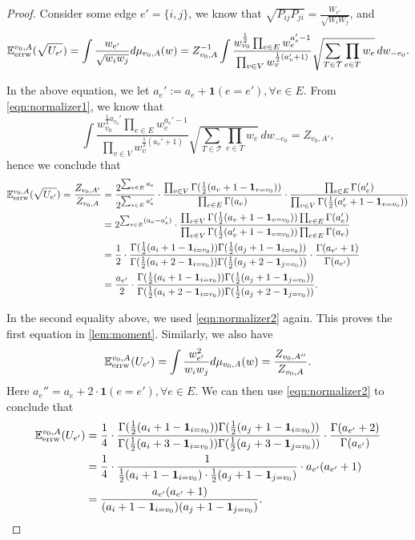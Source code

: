 \documentclass[a4paper, 11pt]{article}
\newcommand{\E}{\mathbb{E}}
\newcommand{\Eerrw}{\E_{\textnormal{errw}}}
\newcommand{\ind}{\mathbf{1}}
\begin{document}
\begin{proof}
Consider some edge $e'=\{i,j\}$, we know that $\sqrt{P_{ij}P_{ji}}=\frac{W_{e'}}{\sqrt{W_iW_j}}$, and
\begin{equation}
\label{eqn:moment1}
\Eerrw^{v_0,A} (\sqrt{U_{e'}}) = \int \frac{w_{e'}}{\sqrt{w_iw_j}} d\mu_{v_0,A}(w) = Z_{v_0, A}^{-1}\int \frac{w_{v_0}^{\frac{1}{2}}\prod_{e\in E}w_e^{a_e'-1}} {\prod_{v\in V}w_v^{\frac{1}{2}(a_v'+1)}}
\sqrt{\sum_{T\in\mathcal{T}}\prod_{e\in T}w_e}\,dw_{-e_0}.
\end{equation}

In the above equation, we let $a_e':=a_e+\ind(e=e'), \forall e\in E$. From \cref{eqn:normalizer1}, we know that
\[\int \frac{w_{v_0}^{\frac{1}{2}a_{v_0}'}\prod_{e\in E}w_e^{a_e'-1}} {\prod_{v\in V}w_v^{\frac{1}{2}(a_v'+1)}}
\sqrt{\sum_{T\in\mathcal{T}}\prod_{e\in T}w_e}\,dw_{-e_0}=Z_{v_0,A'},\]hence we conclude that
\begin{align}
\label{eqn:moment2}
\Eerrw^{v_0,A}(\sqrt{U_{e'}})
= \frac{Z_{v_0, A'}}{Z_{v_0, A}}
&= \frac{2^{\sum_{e\in E}a_e}}{2^{\sum_{e\in E}a_e'}}\cdot \frac{\prod_{v\in V}\Gamma(\frac{1}{2}(a_v+1-\ind_{v=v_0}))}{\prod_{e\in E}\Gamma(a_e)}\cdot \frac{\prod_{e\in E}\Gamma(a_e')}{\prod_{v\in V}\Gamma(\frac{1}{2}(a_v'+1-\ind_{v=v_0}))}\nonumber \\
&= 2^{\sum_{e\in E}(a_e-a_e')}\cdot \frac{\prod_{v\in V}\Gamma(\frac{1}{2}(a_v+1-\ind_{v=v_0}))\prod_{e\in E}\Gamma(a_e')}{\prod_{v\in V}\Gamma(\frac{1}{2}(a_v'+1-\ind_{v=v_0})) \prod_{e\in E}\Gamma(a_e)}\nonumber \\
&= \frac{1}{2}\cdot \frac{\Gamma(\frac{1}{2}(a_i+1-\ind_{i=v_0}))\Gamma(\frac{1}{2}(a_j+1-\ind_{i=v_0}))}{\Gamma(\frac{1}{2}(a_i+2-\ind_{i=v_0}))\Gamma(\frac{1}{2}(a_j+2-\ind_{j=v_0}))}\cdot \frac{\Gamma(a_{e'}+1)}{\Gamma(a_{e'})}\nonumber \\
&= \frac{a_{e'}}{2}\cdot \frac{\Gamma(\frac{1}{2}(a_i+1-\ind_{i=v_0}))\Gamma(\frac{1}{2}(a_j+1-\ind_{j=v_0}))}{\Gamma(\frac{1}{2}(a_i+2-\ind_{i=v_0}))\Gamma(\frac{1}{2}(a_j+2-\ind_{j=v_0}))}.
\end{align}

In the second equality above, we used \cref{eqn:normalizer2} again.  This proves the first equation in \cref{lem:moment}. Similarly, we also have
\[\Eerrw^{v_0,A} (U_{e'})
= \int \frac{w_{e'}^2}{w_iw_j} d\mu_{v_0,A}(w)= \frac{Z_{v_0, A''}}{Z_{v_0, A}}.\]
Here $a_e''=a_e+2\cdot\ind(e=e'), \forall e\in E$. We can then use \cref{eqn:normalizer2} to conclude that
\begin{align}
\label{eqn:moment3}
\Eerrw^{v_0,A} (U_{e'})
&= \frac{1}{4}\cdot \frac{\Gamma(\frac{1}{2}(a_i+1-\ind_{i=v_0}))\Gamma(\frac{1}{2}(a_j+1-\ind_{i=v_0}))}{\Gamma(\frac{1}{2}(a_i+3-\ind_{i=v_0}))\Gamma(\frac{1}{2}(a_j+3-\ind_{j=v_0}))}\cdot \frac{\Gamma(a_{e'}+2)}{\Gamma(a_{e'})}\nonumber \\
&= \frac{1}{4}\cdot \frac{1}{\frac{1}{2}(a_i+1-\ind_{i=v_0})\cdot \frac{1}{2}(a_j+1-\ind_{j=v_0})}\cdot a_{e'}(a_{e'}+1)\nonumber \\
&= \frac{a_{e'}(a_{e'}+1)}{(a_i+1-\ind_{i=v_0})(a_j+1-\ind_{j=v_0})}.
\end{align}


\end{proof}
\end{document}
